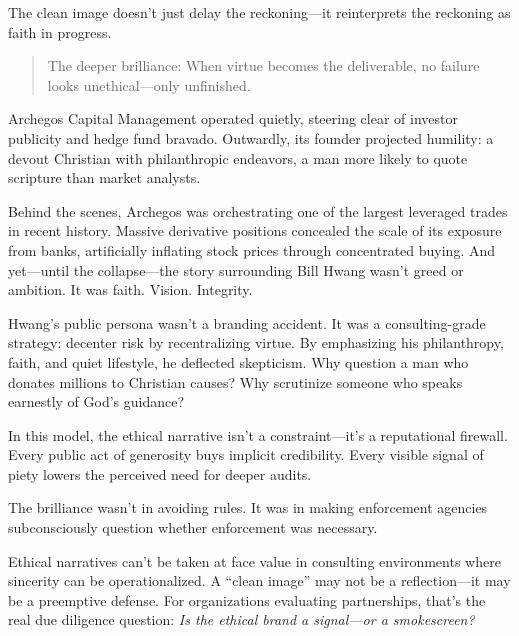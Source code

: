 The clean image doesn’t just delay the reckoning—it reinterprets the reckoning as faith in progress.

\begin{quote}
The deeper brilliance: When virtue becomes the deliverable, no failure looks unethical—only unfinished.
\end{quote}





\begin{tcolorbox}[colback=blue!5!white, colframe=blue!50!black, breakable, title={Historical Sidebar: Bill Hwang, Archegos, and the Ethics Firewall}]

Archegos Capital Management operated quietly, steering clear of investor publicity and hedge fund bravado. Outwardly, its founder projected humility: a devout Christian with philanthropic endeavors, a man more likely to quote scripture than market analysts.

Behind the scenes, Archegos was orchestrating one of the largest leveraged trades in recent history. Massive derivative positions concealed the scale of its exposure from banks, artificially inflating stock prices through concentrated buying. And yet—until the collapse—the story surrounding Bill Hwang wasn’t greed or ambition. It was faith. Vision. Integrity.

Hwang’s public persona wasn’t a branding accident. It was a consulting-grade strategy: decenter risk by recentralizing virtue. By emphasizing his philanthropy, faith, and quiet lifestyle, he deflected skepticism. Why question a man who donates millions to Christian causes? Why scrutinize someone who speaks earnestly of God’s guidance?

In this model, the ethical narrative isn’t a constraint—it’s a reputational firewall. Every public act of generosity buys implicit credibility. Every visible signal of piety lowers the perceived need for deeper audits.

The brilliance wasn’t in avoiding rules. It was in making enforcement agencies subconsciously question whether enforcement was necessary.

Ethical narratives can’t be taken at face value in consulting environments where sincerity can be operationalized. A “clean image” may not be a reflection—it may be a preemptive defense. For organizations evaluating partnerships, that’s the real due diligence question: \textit{Is the ethical brand a signal—or a smokescreen?}

\end{tcolorbox}





